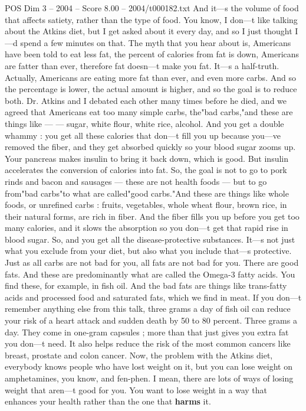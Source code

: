 \begin{textsample}{POS Dim 3 – 2004 – Score 8.00 – 2004/t000182.txt}
And it—s the volume of food that affects satiety, rather than the type of food.
You know, I don—t like talking about the Atkins diet, but I get asked about it every day, and so I just thought I—d spend a few minutes on that.
The myth that you hear about is, Americans have been told to eat less fat, the percent of calories from fat is down, Americans are fatter than ever, therefore fat doesn—t make you fat.
It—s a half-truth.
Actually, Americans are eating more fat than ever, and even more carbs.
And so the percentage is lower, the actual amount is higher, and so the goal is to reduce both.
Dr.
Atkins and I debated each other many times before he died, and we agreed that Americans eat too many simple carbs, the"bad carbs,"and these are things like — — sugar, white flour, white rice, alcohol.
And you get a double whammy : you get all these calories that don—t fill you up because you—ve removed the fiber, and they get absorbed quickly so your blood sugar zooms up.
Your pancreas makes insulin to bring it back down, which is good.
But insulin accelerates the conversion of calories into fat.
So, the goal is not to go to pork rinds and bacon and sausages — these are not health foods — but to go from"bad carbs"to what are called"good carbs."And these are things like whole foods, or unrefined carbs : fruits, vegetables, whole wheat flour, brown rice, in their natural forms, are rich in fiber.
And the fiber fills you up before you get too many calories, and it slows the absorption so you don—t get that rapid rise in blood sugar.
So, and you get all the disease-protective substances.
It—s not just what you exclude from your diet, but also what you include that—s protective.
Just as all carbs are not bad for you, all fats are not bad for you.
There are good fats.
And these are predominantly what are called the Omega-3 fatty acids.
You find these, for example, in fish oil.
And the bad fats are things like trans-fatty acids and processed food and saturated fats, which we find in meat.
If you don—t remember anything else from this talk, three grams a day of fish oil can reduce your risk of a heart attack and sudden death by 50 to 80 percent.
Three grams a day.
They come in one-gram capsules ; more than that just gives you extra fat you don—t need.
It also helps reduce the risk of the most common cancers like breast, prostate and colon cancer.
Now, the problem with the Atkins diet, everybody knows people who have lost weight on it, but you can lose weight on amphetamines, you know, and fen-phen.
I mean, there are lots of ways of losing weight that aren—t good for you.
You want to lose weight in a way that enhances your health rather than the one that \textbf{harms} it.

\end{textsample}
